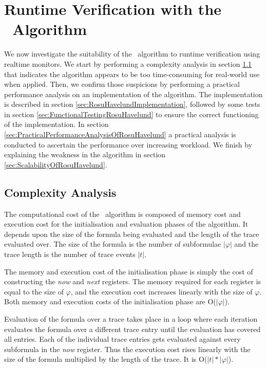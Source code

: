\chapter{Runtime Verification with the \RH\ Algorithm}
\label{chap:Runtime Verification with the Rosu-Havelund Algorithm}

We now investigate the suitability of the \RH\ algorithm to runtime verification using realtime monitors.  We start by performing a complexity analysis in section \ref{sec:ComplexityAnalysis} that indicates the algorithm appears to be too time-consuming for real-world use when applied.  Then, we confirm those suspicions by performing a practical performance analysis on an implementation of the algorithm.  The implementation is described in section \ref{sec:RosuHavelundImplementation}, followed by some tests in section \ref{sec:FunctionalTestingRosuHavelund} to ensure the correct functioning of the implementation.  In section \ref{sec:PracticalPerformanceAnalysisOfRosuHavelund} a practical analysis is conducted to ascertain the performance over increasing workload.  We finish by explaining the weakness in the algorithm in section \ref{sec:ScalabilityOfRosuHavelund}.

\section{Complexity Analysis}
\label{sec:ComplexityAnalysis}

The computational cost of the \RH\ algorithm is composed of memory cost and execution cost for the initialisation and evaluation phases of the algorithm.  It depends upon the size of the formula being evaluated and the length of the trace evaluated over.  The size of the formula is the number of subformulae $ | \varphi | $ and the trace length is the number of trace events $ | t | $.

The memory and execution cost of the initialisation phase is simply the cost of constructing the \textit{now} and \textit{next} registers. The memory required for each register is equal to the size of $ \varphi $, and the execution cost increases linearly with the size of $ \varphi $.  Both memory and execution costs of the initialisation phase are O($ | \varphi | $).

Evaluation of the formula over a trace takes place in a loop where each iteration evaluates the formula over a different trace entry until the evaluation has covered all entries.  Each of the individual trace entries gets evaluated against every subformula in the \textit{now} register.  Thus the execution cost rises linearly with the size of the formula multiplied by the length of the trace. It is O($ | t | * | \varphi | $).

